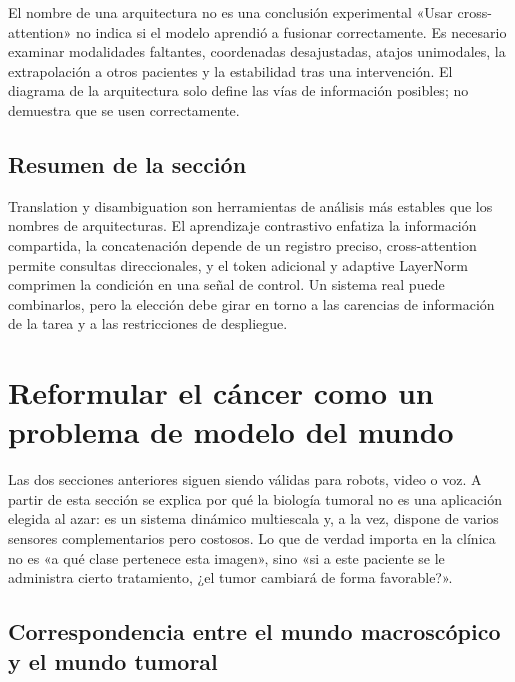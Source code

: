 \documentclass[a4paper]{article}
\begin{document}

\begin{warningbox}{El nombre de una arquitectura no es una conclusión experimental}
«Usar cross-attention» no indica si el modelo aprendió a fusionar correctamente. Es necesario examinar modalidades faltantes, coordenadas desajustadas, atajos unimodales, la extrapolación a otros pacientes y la estabilidad tras una intervención. El diagrama de la arquitectura solo define las vías de información posibles; no demuestra que se usen correctamente.
\end{warningbox}

\subsection{Resumen de la sección}

Translation y disambiguation son herramientas de análisis más estables que los nombres de arquitecturas. El aprendizaje contrastivo enfatiza la información compartida, la concatenación depende de un registro preciso, cross-attention permite consultas direccionales, y el token adicional y adaptive LayerNorm comprimen la condición en una señal de control. Un sistema real puede combinarlos, pero la elección debe girar en torno a las carencias de información de la tarea y a las restricciones de despliegue.
\section{Reformular el cáncer como un problema de modelo del mundo}

Las dos secciones anteriores siguen siendo válidas para robots, video o voz. A partir de esta sección se explica por qué la biología tumoral no es una aplicación elegida al azar: es un sistema dinámico multiescala y, a la vez, dispone de varios sensores complementarios pero costosos. Lo que de verdad importa en la clínica no es «a qué clase pertenece esta imagen», sino «si a este paciente se le administra cierto tratamiento, ¿el tumor cambiará de forma favorable?».

\subsection{Correspondencia entre el mundo macroscópico y el mundo tumoral}
\end{document}
